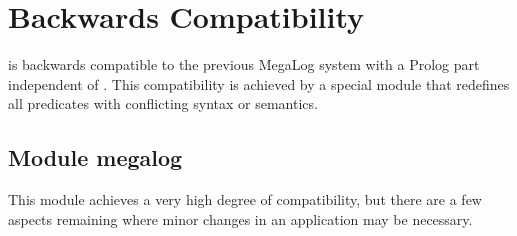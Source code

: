 %
% 
% 
% 
% 


\newpage

\chapter{Backwards Compatibility}
\label{backwards-compat}

\eclipse is backwards compatible to the previous
MegaLog system with a Prolog part independent of \eclipse. This
compatibility is achieved by a special module that redefines all
predicates with conflicting syntax or semantics.

\section{Module {\bf megalog}}

This module
achieves a very high degree of compatibility, but there are a
few aspects remaining where minor changes in an application
may be necessary.

